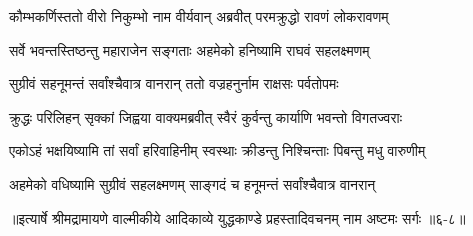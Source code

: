 \twolineshloka
{कौम्भकर्णिस्ततो वीरो निकुम्भो नाम वीर्यवान्}
{अब्रवीत् परमक्रुद्धो रावणं लोकरावणम्} %

\twolineshloka
{सर्वे भवन्तस्तिष्ठन्तु महाराजेन सङ्गताः}
{अहमेको हनिष्यामि राघवं सहलक्ष्मणम्} %

\twolineshloka
{सुग्रीवं सहनूमन्तं सर्वांश्चैवात्र वानरान्}
{ततो वज्रहनुर्नाम राक्षसः पर्वतोपमः} %

\twolineshloka
{क्रुद्धः परिलिहन् सृक्कां जिह्वया वाक्यमब्रवीत्}
{स्वैरं कुर्वन्तु कार्याणि भवन्तो विगतज्वराः} %

\twolineshloka
{एकोऽहं भक्षयिष्यामि तां सर्वां हरिवाहिनीम्}
{स्वस्थाः क्रीडन्तु निश्चिन्ताः पिबन्तु मधु वारुणीम्} %

\twolineshloka
{अहमेको वधिष्यामि सुग्रीवं सहलक्ष्मणम्}
{साङ्गदं च हनूमन्तं सर्वांश्चैवात्र वानरान्} %


॥इत्यार्षे श्रीमद्रामायणे वाल्मीकीये आदिकाव्ये युद्धकाण्डे प्रहस्तादिवचनम् नाम अष्टमः सर्गः ॥६-८॥
